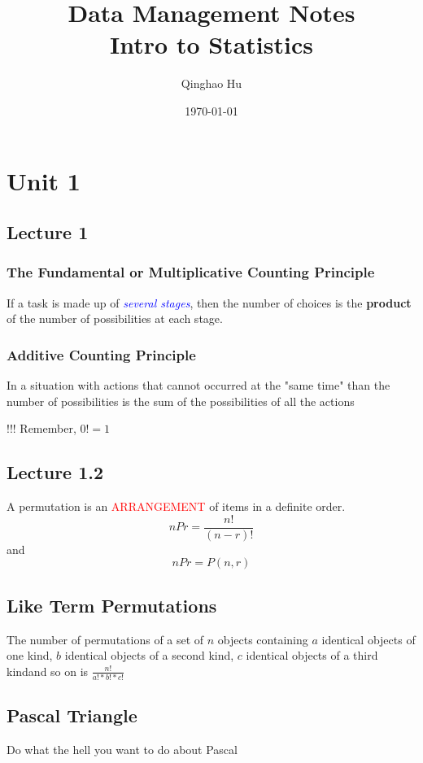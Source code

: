 \documentclass[11pt]{report}
\title{\textbf{Data Management Notes} \\ \large Intro to Statistics}
\author{Qinghao Hu}
\date{\today}
\theoremstyle{remark}
\begin{document}
\maketitle
\tableofcontents
\newpage

\chapter{Unit 1}
\section{Lecture 1}
\subsection{The Fundamental or Multiplicative Counting Principle}
If a task is made up of \textcolor{blue}{\textit{several stages}}, then the number of choices is the \textbf{product} 
of the number of possibilities at each stage. 

\subsection{Additive Counting Principle}
In a situation with actions that cannot occurred at the "same time" than the number
of possibilities is the sum of the possibilities of all the actions

\begin{center}
    !!! Remember, $0! = 1$
\end{center}

\section{Lecture 1.2}
A permutation is an \textcolor{red}{ARRANGEMENT} of items in a definite order.
\[
    nPr = \frac{n!}{(n - r)!}
\]
and 
\[
    nPr = P(n, r)
\]

\section{Like Term Permutations}
The number of permutations of a set of $n$ objects containing $a$ identical objects of one kind, 
$b$ identical objects of a second kind, $c$ identical objects of a third kindand so on is $\frac{n!}{a! * b! * c!}$

\section{Pascal Triangle}
Do what the hell you want to do about Pascal 
\end{document}
